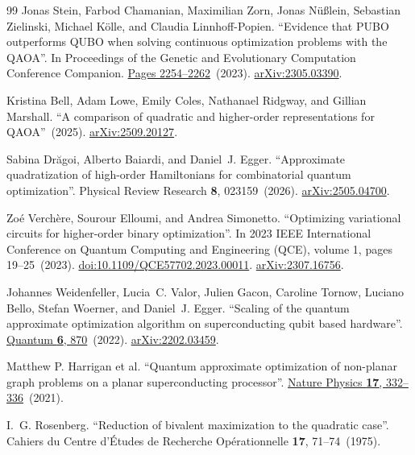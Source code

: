 \documentclass[a4paper,onecolumn,11pt,unpublished]{quantumarticle}
\theoremstyle{remark}
\begin{document}
\begin{thebibliography}{99}
Jonas Stein, Farbod Chamanian, Maximilian Zorn, Jonas N{\"u}{\ss}lein, Sebastian Zielinski, Michael K{\"o}lle, and Claudia Linnhoff-Popien.
\newblock ``Evidence that PUBO outperforms QUBO when solving continuous optimization problems with the QAOA''.
\newblock In Proceedings of the Genetic and Evolutionary Computation Conference Companion.
\newblock \href{https://dx.doi.org/10.1145/3583133.3596358}{Pages 2254--2262}~(2023).
\newblock \href{http://arxiv.org/abs/2305.03390}{arXiv:2305.03390}.

Kristina Bell, Adam Lowe, Emily Coles, Nathanael Ridgway, and Gillian Marshall.
\newblock ``A comparison of quadratic and higher-order representations for QAOA''~(2025).
\newblock \href{http://arxiv.org/abs/2509.20127}{arXiv:2509.20127}.

Sabina Dr{\u a}goi, Alberto Baiardi, and Daniel~J. Egger.
\newblock ``Approximate quadratization of high-order Hamiltonians for combinatorial quantum optimization''.
\newblock Physical Review Research {\bf 8}, 023159~(2026).
\newblock \href{http://arxiv.org/abs/2505.04700}{arXiv:2505.04700}.

Zo{\'e} Verch{\`e}re, Sourour Elloumi, and Andrea Simonetto.
\newblock ``Optimizing variational circuits for higher-order binary optimization''.
\newblock In 2023 IEEE International Conference on Quantum Computing and Engineering (QCE), volume 1, pages 19--25~(2023).
\newblock \href{https://dx.doi.org/10.1109/QCE57702.2023.00011}{doi:10.1109/QCE57702.2023.00011}.
\newblock \href{http://arxiv.org/abs/2307.16756}{arXiv:2307.16756}.

Johannes Weidenfeller, Lucia~C. Valor, Julien Gacon, Caroline Tornow, Luciano Bello, Stefan Woerner, and Daniel~J. Egger.
\newblock ``Scaling of the quantum approximate optimization algorithm on superconducting qubit based hardware''.
\newblock \href{https://dx.doi.org/10.22331/q-2022-12-07-870}{Quantum {\bf 6}, 870}~(2022).
\newblock \href{http://arxiv.org/abs/2202.03459}{arXiv:2202.03459}.

Matthew P. Harrigan et al.
\newblock ``Quantum approximate optimization of non-planar graph problems on a planar superconducting processor''.
\newblock \href{https://doi.org/10.1038/s41567-020-01105-y}{Nature Physics {\bf 17}, 332--336}~(2021).


I.~G. Rosenberg.
\newblock ``Reduction of bivalent maximization to the quadratic case''.
\newblock Cahiers du Centre d'\'Etudes de Recherche Op\'erationnelle {\bf 17}, 71--74~(1975).


\end{thebibliography}
\end{document}
